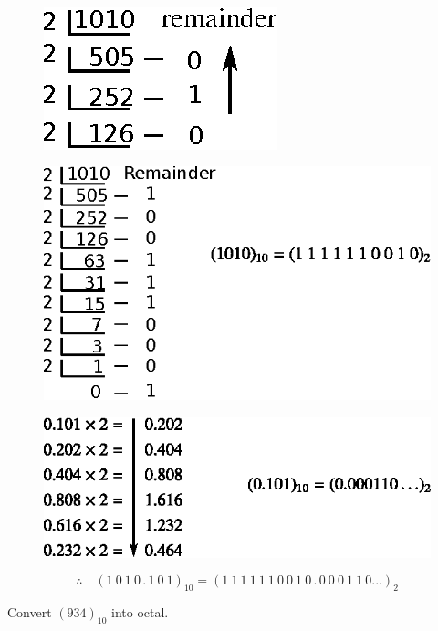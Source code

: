 \begin{solution}
~
\begin{figure}[H]
\centering
\includegraphics{chap5/div8.eps}
\end{figure}
\begin{figure}[H]
\centering
\includegraphics{chap5/div9.eps}
\end{figure}
\begin{figure}[H]
\centering
\includegraphics[scale=.97]{chap5/div9a.eps}
\end{figure}
$$
\therefore\quad (1~0~1~0\,.\,1~0~1)_{10}=(1~1~1~1~1~1~0~0~1~0\,.\,0~0~0~1~1~0...)_{2}
$$
\end{solution}

\begin{problem}\label{prob5.9}
Convert $(934)_{10}$ into octal.
\end{problem}

